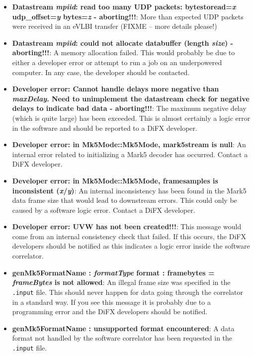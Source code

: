 \begin{itemize}
\item {\bf Datastream {\it mpiid}: read too many UDP packets: bytestoread={\it x} udp\_offset={\it y} bytes={\it z} - aborting!!!}:
More than expected UDP packets were received in an eVLBI transfer (FIXME -- more details please!)

\item {\bf Datastream {\it mpiid}: could not allocate databuffer (length {\it size}) - aborting!!!}:
A memory allocation failed.
This would probably be due to either a developer error or attempt to run a job on an underpowered computer. 
In any case, the developer should be contacted.

\item {\bf Developer error: Cannot handle delays more negative than {\it maxDelay}. Need to unimplement the datastream check for negative delays to indicate bad data - aborting!!!}:
The maximum negative delay (which is quite large) has been exceeded.
This is almost certainly a logic error in the software and should be reported to a DiFX developer.

\item {\bf Developer error: in Mk5Mode::Mk5Mode, mark5stream is null}:
An internal error related to initializing a Mark5 decoder has occurred.
Contact a DiFX developer.

\item {\bf Developer error: in Mk5Mode::Mk5Mode, framesamples is inconsistent ({\it x}/{\it y})}:
An internal inconsistency has been found in the Mark5 data frame size that would lead to downstream errors.
This could only be caused by a software logic error.
Contact a DiFX developer.

\item {\bf Developer error: UVW has not been created!!!}:
This message would come from an internal consistency check that failed.
If this occurs, the DiFX developers should be notified as this indicates a logic error inside the software correlator.

\item {\bf genMk5FormatName : {\it formatType} format : framebytes = {\it frameBytes} is not allowed}:
An illegal frame size was specified in the {\tt .input} file.
This should never happen for data going through the correlator in a standard way.
If you see this message it is probably due to a programming error and the DiFX developers should be notified.

\item {\bf genMk5FormatName : unsupported format encountered}:
A data format not handled by the software correlator has been requested in the {\tt .input} file.


\end{itemize}

